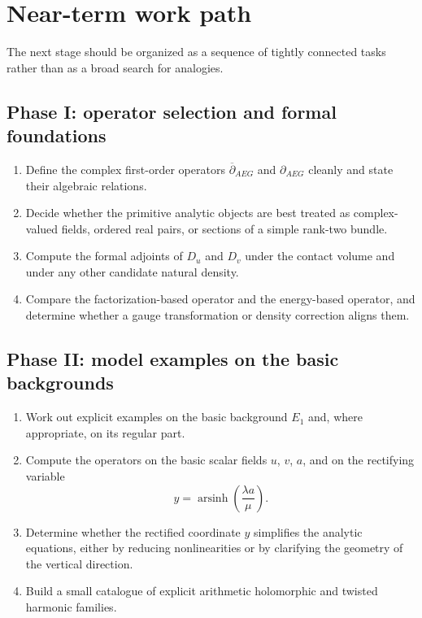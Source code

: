 \documentclass[11pt]{article}
\newcommand{\AEG}{AEG}
\newcommand{\arsinh}{\operatorname{arsinh}}
\newcommand{\delbar}{\overline{\partial}_{\!\AEG}}
\newcommand{\delAEG}{\partial_{\!\AEG}}
\begin{document}
\section{Near-term work path}

The next stage should be organized as a sequence of tightly connected tasks rather than as a broad search for analogies.

\subsection*{Phase I: operator selection and formal foundations}
\begin{enumerate}[label=I.\arabic*.]
\item Define the complex first-order operators $\delbar$ and $\delAEG$ cleanly and state their algebraic relations.
\item Decide whether the primitive analytic objects are best treated as complex-valued fields, ordered real pairs, or sections of a simple rank-two bundle.
\item Compute the formal adjoints of $D_u$ and $D_v$ under the contact volume and under any other candidate natural density.
\item Compare the factorization-based operator and the energy-based operator, and determine whether a gauge transformation or density correction aligns them.
\end{enumerate}

\subsection*{Phase II: model examples on the basic backgrounds}
\begin{enumerate}[label=II.\arabic*.]
\item Work out explicit examples on the basic background $E_1$ and, where appropriate, on its regular part.
\item Compute the operators on the basic scalar fields $u$, $v$, $a$, and on the rectifying variable
\begin{equation}
 y = \arsinh\!\left(\frac{\lambda a}{\mu}\right).
\end{equation}
\item Determine whether the rectified coordinate $y$ simplifies the analytic equations, either by reducing nonlinearities or by clarifying the geometry of the vertical direction.
\item Build a small catalogue of explicit arithmetic holomorphic and twisted harmonic families.
\end{enumerate}
\end{document}
